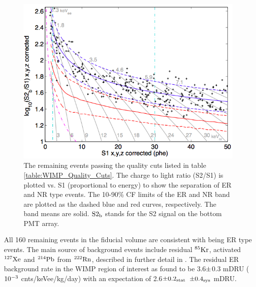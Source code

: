  \begin{figure}[h!]\centering
\includegraphics[width=120mm]{Chapter_LUX_Det/LUX_Result.png}
\caption{The remaining events passing the quality cuts listed in table \ref{table:WIMP_Quality_Cuts}. The charge to light ratio (S2/S1) is plotted vs. S1 (proportional to energy) to show the separation of ER and NR type events. The 10-90\% CF limits of the ER and NR band are plotted as the dashed blue and red curves, respectively. The band means are solid. $\rm S2_b$ stands for the S2 signal on the bottom PMT array. }
\label{fig:LUX_Result}
\end{figure}

\newpage

All 160 remaining events in the fiducial volume are consistent with being ER type events. The main source of background events include residual $\rm^{85}Kr$, activated $\rm^{127}Xe$ and $\rm^{214}Pb$ from $\rm^{222}Rn$, described in further detail in \cite{LUX_BG}. The residual ER background rate in the WIMP region of interest as found to be 3.6$\rm\pm$0.3 mDRU ($\rm 10^{-3}$ cnts/keVee/kg/day) with an expectation of 2.6$\rm\pm 0.2_{stat}$ $\rm\pm 0.4_{sys}$ mDRU.


